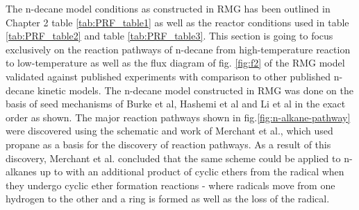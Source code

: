 The n-decane model conditions as constructed in RMG has been outlined in Chapter 2 table \ref{tab:PRF_table1} as well as the reactor conditions used in table \ref{tab:PRF_table2} and table \ref{tab:PRF_table3}. This section is going to focus exclusively on the reaction pathways of n-decane from high-temperature reaction to low-temperature as well as the flux diagram of fig. \ref{fig:f2} of the RMG model validated against published experiments with comparison to other published n-decane kinetic models. The n-decane model constructed in RMG was done on the basis of seed mechanisms of 
Burke et al\cite{Burke2012ComprehensiveCombustion}, Hashemi et al\cite{Hashemi2016High-pressureMethane} and Li et al\cite{Li2017TheoreticalC2H4} in the exact order as shown. The major reaction pathways shown in fig.\ref{fig:n-alkane-pathway} were discovered using the schematic and work of Merchant et al.\cite{Merchant2015UnderstandingPropane}, which used propane as a basis for the discovery of reaction pathways. As a result of this discovery, Merchant et al. concluded that the same scheme could be applied to n-alkanes up to  with an additional product of cyclic ethers from the  radical when they undergo cyclic ether formation reactions - where radicals move from one hydrogen to the other and a ring is formed as well as the loss of the  radical.



\newpage

